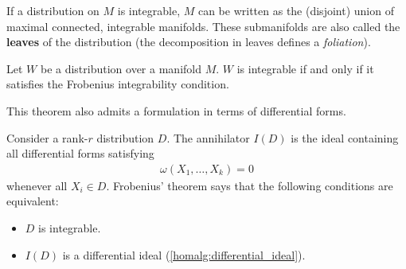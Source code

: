     \begin{property}
        If a distribution on $M$ is integrable, $M$ can be written as the (disjoint) union of maximal connected, integrable manifolds. These submanifolds are also called the \textbf{leaves} of the distribution (the decomposition in leaves defines a \textit{foliation}).
    \end{property}

    \begin{theorem}\label{bundle:frobenius}
        Let $W$ be a distribution over a manifold $M$. $W$ is integrable if and only if it satisfies the Frobenius integrability condition.
    \end{theorem}

    This theorem also admits a formulation in terms of differential forms.
    \begin{property}\label{bundle:differential_frobenius}
        Consider a rank-$r$ distribution $D$. The annihilator $I(D)$ is the ideal containing all differential forms satisfying
        \begin{gather}
            \omega(X_1,\ldots,X_k) = 0
        \end{gather}
        whenever all $X_i\in D$. Frobenius' theorem says that the following conditions are equivalent:
        \begin{itemize}
            \item $D$ is integrable.
            \item $I(D)$ is a differential ideal (\cref{homalg:differential_ideal}).
        \end{itemize}
    \end{property}


